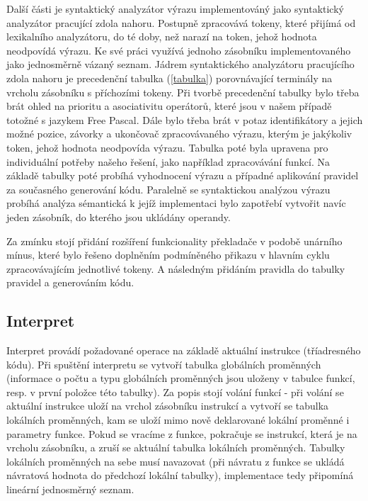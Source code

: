 ﻿\documentclass[12pt]{article}
\begin{document}
Další části je syntaktický analyzátor výrazu implementováný jako syntaktický analyzátor pracující zdola nahoru. Postupně zpracovává tokeny, které přijímá od lexikalního analyzátoru, do té doby, než narazí na token, jehož hodnota neodpovídá výrazu. Ke své práci využívá jednoho zásobníku implementovaného jako jednosměrně vázaný seznam. Jádrem syntaktického analyzátoru pracujícího zdola nahoru je precedenční tabulka (\ref{tabulka}) porovnávající terminály na vrcholu zásobníku s příchozími tokeny. Při tvorbě precedenční tabulky bylo třeba brát ohled na prioritu a asociativitu operátorů, které jsou v našem případě totožné s jazykem Free Pascal. Dále bylo třeba brát v potaz identifikátory a jejich možné pozice, závorky a ukončovač zpracovávaného výrazu, kterým je jakýkoliv token, jehož hodnota neodpovída výrazu. Tabulka poté byla upravena pro individuální potřeby našeho řešení, jako například zpracovávání funkcí. Na základě tabulky poté probíhá vyhodnocení výrazu a případné aplikování pravidel za současného generování kódu. Paralelně se syntaktickou analýzou výrazu probíhá analýza sémantická k jejíž implementaci bylo zapotřebí vytvořit navíc jeden zásobník, do kterého jsou ukládány operandy.

Za zmínku stojí přidání rozšíření funkcionality překladače v podobě unárního mínus, které bylo řešeno doplněním podmíněného přikazu v hlavním cyklu zpracovávajícím jednotlivé tokeny. A následným přidáním pravidla do tabulky pravidel a generováním kódu.

\newpage
\subsection{Interpret}

Interpret provádí požadované operace na základě aktuální instrukce (tříadresného kódu). Při spuštění interpretu se vytvoří tabulka globálních proměnných (informace o počtu a typu globálních proměnných jsou uloženy v tabulce funkcí, resp. v první položce této tabulky). Za popis stojí volání funkcí - při volání se aktuální instrukce uloží na vrchol zásobníku instrukcí a vytvoří se tabulka lokálních proměnných, kam se uloží mimo nově deklarované lokální proměnné i parametry funkce. Pokud se vracíme z funkce, pokračuje se instrukcí, která je na vrcholu zásobníku, a zruší se aktuální tabulka lokálních proměnných. Tabulky lokálních proměnných na sebe musí navazovat (při návratu z funkce se ukládá návratová hodnota do předchozí lokální tabulky), implementace tedy připomíná lineární jednosměrný seznam.
\end{document}
